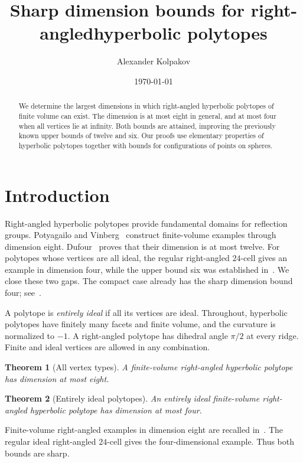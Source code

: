 \documentclass[11pt]{article}
\title{Sharp dimension bounds for right-angled\linebreak hyperbolic polytopes}
\author{Alexander Kolpakov}
\date{\today}
\newtheorem{theorem}{Theorem}
\theoremstyle{remark}
\begin{document}
\nocite{*}
\maketitle
\begin{abstract}
We determine the largest dimensions in which right-angled hyperbolic
polytopes of finite volume can exist. The dimension is at most eight
in general, and at most four when all vertices lie at infinity. Both
bounds are attained, improving the previously known upper bounds of
twelve and six. Our proofs use elementary properties of hyperbolic
polytopes together with bounds for configurations of points on spheres.
\end{abstract}

\section{Introduction}

Right-angled hyperbolic polytopes provide fundamental domains for
reflection groups. Potyagailo and
Vinberg~\cite{PV} construct finite-volume examples through dimension
eight. Dufour~\cite{Dufour} proves that their dimension is at most
twelve. For polytopes whose vertices are all ideal, the regular
right-angled $24$-cell gives an example in dimension four, while
the upper bound six was established in~\cite[Corollary~7]{Kolpakov}.
We close these two gaps. The compact case already has the sharp
dimension bound four; see~\cite[Section~2]{PV}.

A polytope is \emph{entirely ideal} if all its vertices are ideal.
Throughout, hyperbolic polytopes have finitely many facets and finite
volume, and the curvature is normalized to $-1$.
A right-angled polytope has dihedral angle $\pi/2$ at every ridge.
Finite and ideal vertices are allowed in any combination.

\begin{theorem}[All vertex types]\label{thm:general}
A finite-volume right-angled hyperbolic polytope has dimension at
most eight.
\end{theorem}

\begin{theorem}[Entirely ideal polytopes]\label{thm:ideal}
An entirely ideal finite-volume right-angled hyperbolic polytope has
dimension at most four.
\end{theorem}

Finite-volume right-angled examples in dimension eight are recalled
in~\cite{PV}. The regular ideal right-angled $24$-cell gives the
four-dimensional example. Thus both bounds are sharp.
\end{document}
